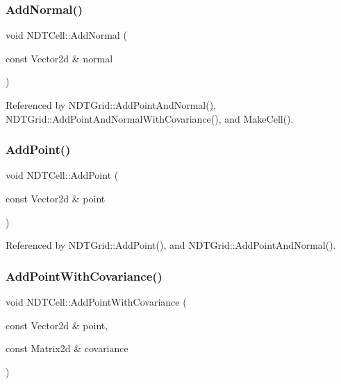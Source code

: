 \subsubsection{\texorpdfstring{Add\+Normal()}{AddNormal()}}
{\footnotesize\ttfamily void N\+D\+T\+Cell\+::\+Add\+Normal (\begin{DoxyParamCaption}\item[{const Vector2d \&}]{normal }\end{DoxyParamCaption})}



Referenced by N\+D\+T\+Grid\+::\+Add\+Point\+And\+Normal(), N\+D\+T\+Grid\+::\+Add\+Point\+And\+Normal\+With\+Covariance(), and Make\+Cell().

\mbox{\label{classNDTCell_a3471fe2826aa78a9f36e0f6435ad564e}} 
\subsubsection{\texorpdfstring{Add\+Point()}{AddPoint()}}
{\footnotesize\ttfamily void N\+D\+T\+Cell\+::\+Add\+Point (\begin{DoxyParamCaption}\item[{const Vector2d \&}]{point }\end{DoxyParamCaption})}



Referenced by N\+D\+T\+Grid\+::\+Add\+Point(), and N\+D\+T\+Grid\+::\+Add\+Point\+And\+Normal().

\mbox{\label{classNDTCell_a0724e1fb86da119b2886bc63490152a2}} 
\subsubsection{\texorpdfstring{Add\+Point\+With\+Covariance()}{AddPointWithCovariance()}}
{\footnotesize\ttfamily void N\+D\+T\+Cell\+::\+Add\+Point\+With\+Covariance (\begin{DoxyParamCaption}\item[{const Vector2d \&}]{point,  }\item[{const Matrix2d \&}]{covariance }\end{DoxyParamCaption})}



